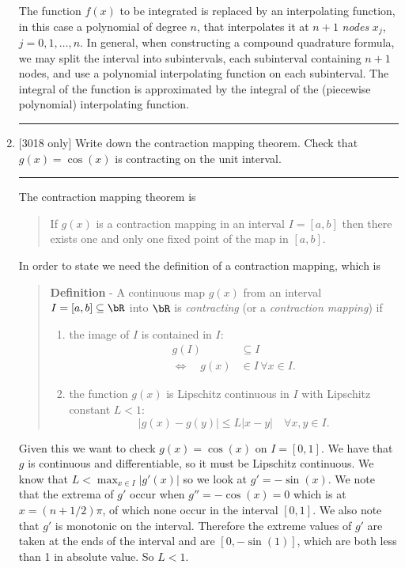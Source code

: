 \documentclass[10pt]{article}
\begin{document}
\begin{enumerate}
  The function $f(x)$ to be integrated is replaced by an interpolating
  function, in this case a polynomial of degree $n$, that interpolates
  it at $n+1$ \emph{nodes} $x_j$, $j=0,1,\ldots,n$. In general, when
  constructing a compound quadrature formula, we may split the
  interval into subintervals, each subinterval containing $n+1$ nodes,
  and use a polynomial interpolating function on each subinterval. The
  integral of the function is approximated by the integral of the
  (piecewise polynomial) interpolating function.
  \begin{center}
    \rule{0.9\textwidth}{.1pt}
  \end{center}
\item{} [3018 only] Write down the contraction mapping theorem. Check
  that $g(x) = \cos(x)$ is contracting on the unit interval.
  \begin{center}
    \rule{0.9\textwidth}{.1pt}
  \end{center}
  The contraction mapping theorem is
  \begin{quote}
    If $g(x)$ is a contraction mapping in an interval $I=[a,b]$ then
    there exists one and only one fixed point of the map in $[a,b]$.
  \end{quote}
  In order to state we need the definition of a contraction mapping,
  which is
  \begin{quotation}
    \textbf{Definition} - A continuous map $g(x)$ from an interval
    $I=[a,b] \subseteq \bR$ into $\bR$ is \textit{contracting} (or a
    \emph{contraction mapping}) if
    \begin{enumerate}
    \item the image of $I$ is contained in $I$:
      \begin{align*}
        g(I) & \subseteq I \\
        \Leftrightarrow \quad g(x) & \in I \, \forall x \in I .
      \end{align*}
    \item the function $g(x)$ is Lipschitz continuous in $I$ with
      Lipschitz constant $L < 1$:
      \begin{equation*} 
        | g(x) - g(y) | \le L | x - y | \quad \forall x,y \in I .
      \end{equation*}
    \end{enumerate}
  \end{quotation}

  Given this we want to check $g(x) = \cos(x)$ on $I = [0, 1]$. We
  have that $g$ is continuous and differentiable, so it must be
  Lipschitz continuous. We know that $L < \max_{x \in I} |g'(x)|$ so
  we look at $g' = -\sin(x)$. We note that the extrema of $g'$ occur
  when $g'' = - \cos(x) = 0$ which is at $x = (n+1/2)\pi$, of which
  none occur in the interval $[0, 1]$. We also note that $g'$ is
  monotonic on the interval. Therefore the extreme values of $g'$ are
  taken at the ends of the interval and are $[0, -\sin(1)]$, which are
  both less than 1 in absolute value. So $L<1$.


\end{enumerate}
\end{document}
